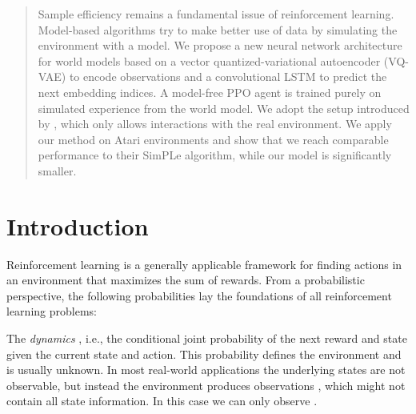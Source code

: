 \documentclass{article}
\begin{document}





\printAffiliationsAndNotice{}  

\begin{abstract}
 Sample efficiency remains a fundamental issue of reinforcement learning.
Model-based algorithms try to make better use of data by simulating the
environment with a model. We propose a new neural network architecture for
world models based on a vector quantized-variational autoencoder (VQ-VAE)
to encode observations and a convolutional LSTM to predict the next embedding
indices. A model-free PPO agent is trained purely on simulated experience from
the world model. We adopt the setup introduced by \citet{simple}, which only
allows  interactions with the real environment. We apply our method on
 Atari environments and show that we reach comparable performance to their
\mbox{SimPLe} algorithm, while our model is significantly smaller.
\end{abstract}

\section{Introduction}

Reinforcement learning is a generally applicable framework for finding actions
in an environment that maximizes the sum of rewards. From a probabilistic
perspective, the following probabilities lay the foundations of all
reinforcement learning problems:

The \textit{dynamics} , i.e., the conditional
joint probability of the next reward and state given the current state and
action. This probability defines the environment and is usually unknown. In most
real-world applications the underlying states  are not observable, but
instead the environment produces observations , which might not contain all
state information. In this case we can only observe
.
\end{document}
